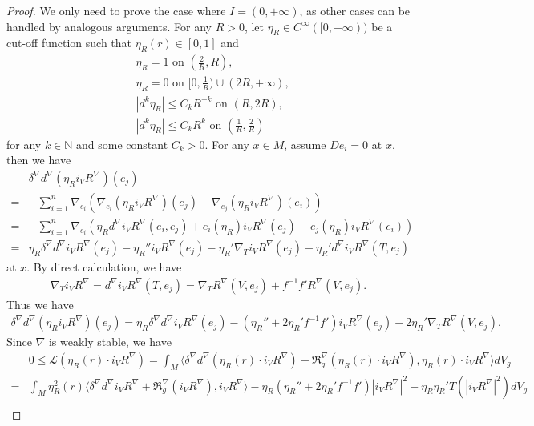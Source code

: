 \documentclass{amsart}
\begin{document}
	\begin{proof}
		We only need to prove the case where $I=(0,+\infty)$, as other cases can be handled by analogous arguments. For any $R>0$, let $\eta_R\in C^\infty([0,+\infty))$ be a cut-off function such that $\eta_R(r)\in[0,1]$ and
		\begin{align*}
			&\eta_R=1\textrm{ on }(\frac2R,R),\\
			&\eta_R=0\textrm{ on }[0,\frac1R)\cup(2R,+\infty),\\
			&|d^k\eta_R|\le C_kR^{-k}\textrm{ on }(R,2R),\\
			&|d^k\eta_R|\le C_kR^k\textrm{ on }(\frac1R,\frac2R)
		\end{align*}
		for any $k\in\mathbb{N}$ and some constant $C_k>0$. For any $x\in M$, assume $D e_i=0$ at $x$, then we have
		\begin{align*}
			&\delta^\nabla d^\nabla(\eta_Ri_VR^\nabla)(e_j)\\
			=&-\sum_{i=1}^n\nabla_{e_i}(\nabla_{e_i}(\eta_Ri_VR^\nabla)(e_j)-\nabla_{e_j}(\eta_Ri_VR^\nabla)(e_i))\\
			=&-\sum_{i=1}^n\nabla_{e_i}(\eta_Rd^\nabla i_VR^\nabla(e_i,e_j)+e_i(\eta_R)i_VR^\nabla(e_j)-e_j(\eta_R)i_VR^\nabla(e_i))\\
			=&\eta_R\delta^\nabla d^\nabla i_VR^\nabla(e_j)-\eta_R''i_VR^\nabla(e_j)-\eta_R'\nabla_Ti_VR^\nabla(e_j)-\eta_R' d^\nabla i_VR^\nabla(T,e_j)
		\end{align*}
		at $x$. By direct calculation, we have
		\begin{align*}
			\nabla_Ti_VR^\nabla=d^\nabla i_VR^\nabla(T,e_j)=\nabla_TR^\nabla(V,e_j)+f^{-1}f'R^\nabla(V,e_j).
		\end{align*}
		Thus we have
		\begin{align*}
			\delta^\nabla d^\nabla(\eta_Ri_VR^\nabla)(e_j)=\eta_R\delta^\nabla d^\nabla i_VR^\nabla(e_j)-(\eta_R''+2\eta_R'f^{-1}f')i_VR^\nabla(e_j)-2\eta_R'\nabla_TR^\nabla(V,e_j).
		\end{align*}
		Since $\nabla$ is weakly stable, we have
		\begin{align*}
			&0\le\mathscr{L}(\eta_R(r)\cdot i_VR^\nabla)=\int_M\langle\delta^\nabla d^\nabla(\eta_R(r)\cdot i_VR^\nabla)+\mathfrak{R}^\nabla_g(\eta_R(r)\cdot i_VR^\nabla),\eta_R(r)\cdot i_VR^\nabla\rangle dV_g\\
			=&\int_M\eta_R^2(r)\langle\delta^\nabla d^\nabla i_VR^\nabla+\mathfrak{R}^\nabla_g(i_VR^\nabla),i_VR^\nabla\rangle-\eta_R(\eta_R''+2\eta_R'f^{-1}f')|i_VR^\nabla|^2-\eta_R\eta_R'T(|i_VR^\nabla|^2) dV_g\\

\end{align*}
\end{proof}
\end{document}
